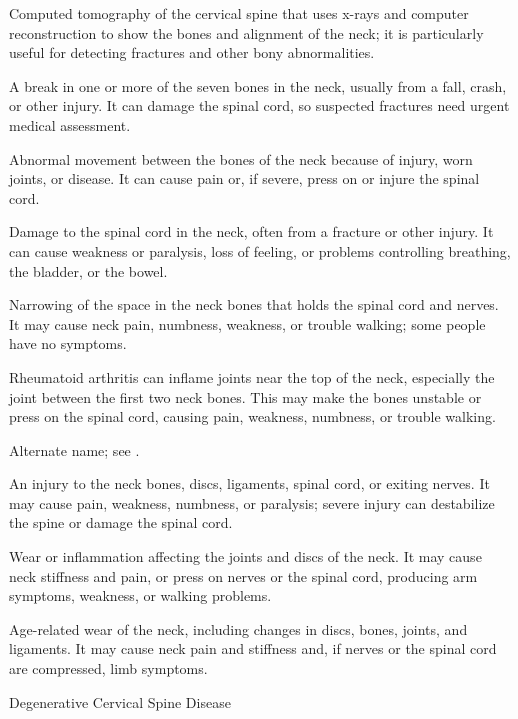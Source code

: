  Computed tomography of the cervical spine that uses x-rays and computer reconstruction to show the bones and alignment of the neck; it is particularly useful for detecting fractures and other bony abnormalities.

 A break in one or more of the seven bones in the neck, usually from a fall, crash, or other injury. It can damage the spinal cord, so suspected fractures need urgent medical assessment.

 Abnormal movement between the bones of the neck because of injury, worn joints, or disease. It can cause pain or, if severe, press on or injure the spinal cord.

 Damage to the spinal cord in the neck, often from a fracture or other injury. It can cause weakness or paralysis, loss of feeling, or problems controlling breathing, the bladder, or the bowel.

 Narrowing of the space in the neck bones that holds the spinal cord and nerves. It may cause neck pain, numbness, weakness, or trouble walking; some people have no symptoms.

 Rheumatoid arthritis can inflame joints near the top of the neck, especially the joint between the first two neck bones. This may make the bones unstable or press on the spinal cord, causing pain, weakness, numbness, or trouble walking.

 Alternate name; see .

 An injury to the neck bones, discs, ligaments, spinal cord, or exiting nerves. It may cause pain, weakness, numbness, or paralysis; severe injury can destabilize the spine or damage the spinal cord.

 Wear or inflammation affecting the joints and discs of the neck. It may cause neck stiffness and pain, or press on nerves or the spinal cord, producing arm symptoms, weakness, or walking problems.

 Age-related wear of the neck, including changes in discs, bones, joints, and ligaments. It may cause neck pain and stiffness and, if nerves or the spinal cord are compressed, limb symptoms.

\synonyms
Degenerative Cervical Spine Disease

